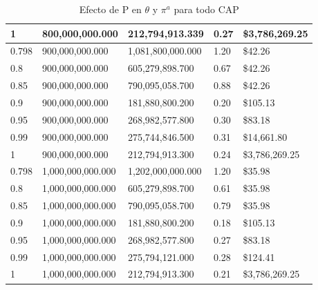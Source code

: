 \begin{table}[H]
\begin{tabular}{|l|l|l|l|l|}
        1 & 800,000,000.000 & 212,794,913.339 & 0.27 &  \$3,786,269.25  \\ \hline
        0.798 & 900,000,000.000 & 1,081,800,000.000 & 1.20 &  \$42.26  \\ \hline
        0.8 & 900,000,000.000 & 605,279,898.700 & 0.67 &  \$42.26  \\ \hline
        0.85 & 900,000,000.000 & 790,095,058.700 & 0.88 &  \$42.26  \\ \hline
        0.9 & 900,000,000.000 & 181,880,800.200 & 0.20 &  \$105.13  \\ \hline
        0.95 & 900,000,000.000 & 268,982,577.800 & 0.30 &  \$83.18  \\ \hline
        0.99 & 900,000,000.000 & 275,744,846.500 & 0.31 &  \$14,661.80  \\ \hline
        1 & 900,000,000.000 & 212,794,913.300 & 0.24 &  \$3,786,269.25  \\ \hline
        0.798 & 1,000,000,000.000 & 1,202,000,000.000 & 1.20 &  \$35.98  \\ \hline
        0.8 & 1,000,000,000.000 & 605,279,898.700 & 0.61 &  \$35.98  \\ \hline
        0.85 & 1,000,000,000.000 & 790,095,058.700 & 0.79 &  \$35.98  \\ \hline
        0.9 & 1,000,000,000.000 & 181,880,800.200 & 0.18 &  \$105.13  \\ \hline
        0.95 & 1,000,000,000.000 & 268,982,577.800 & 0.27 &  \$83.18  \\ \hline
        0.99 & 1,000,000,000.000 & 275,794,121.000 & 0.28 &  \$124.41  \\ \hline
        1 & 1,000,000,000.000 & 212,794,913.300 & 0.21 &  \$3,786,269.25 \\ \hline
    \end{tabular}
    \caption{Efecto de P en $\theta$ y $\pi^a$ para todo CAP}
    \label{efectopenthetapiatodoCAP}
\end{table}


